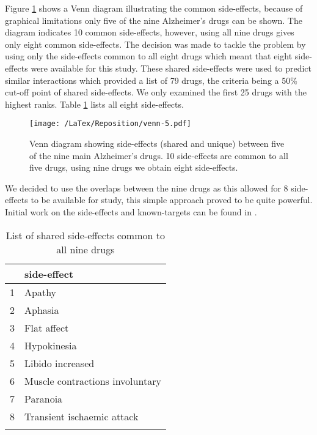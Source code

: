 \documentclass[preprint,12pt]{elsarticle}
\begin{document}
Figure \ref{venn} shows a Venn diagram illustrating the common side-effects, because of graphical limitations only five of the nine Alzheimer's drugs can be shown. The diagram indicates 10 common side-effects, however, using all nine drugs gives only eight common side-effects. The decision was made to tackle the problem by using only the side-effects common to all eight drugs which meant that eight side-effects were available for this study. These shared side-effects were used to predict similar interactions which provided a list of 79 drugs, the criteria being a 50\% cut-off point of shared side-effects. We only examined the first 25 drugs with the highest ranks.   Table \ref{se8} lists all eight side-effects.

\begin{figure}[h]
  \begin{center}
	 \texttt{[image: /LaTex/Reposition/venn-5.pdf]} %
  \end{center}
 \caption{Venn diagram showing side-effects (shared and unique) between five of the nine main Alzheimer's drugs. 10 side-effects are common to all five drugs, using nine drugs we obtain eight side-effects.}
\label{venn}
\end{figure}

We decided to use the overlaps between the nine drugs as this allowed for 8 side-effects to be available for study, this simple approach proved to be quite powerful.  Initial work on the side-effects and known-targets can be found in \cite{McGarry2015a,McGarry2015b,McGarry2016a}. 

\begin{table}[ht]
\centering \scriptsize \caption{List of shared side-effects common to all nine drugs}
\begin{tabular}{rl}
  \hline
 & side-effect \\ 
  \hline
1 & Apathy \\ 
  2 & Aphasia \\ 
  3 & Flat affect \\ 
  4 & Hypokinesia \\ 
  5 & Libido increased \\ 
  6 & Muscle contractions involuntary \\ 
  7 & Paranoia \\ 
  8 & Transient ischaemic attack \\ 
   \hline \normalsize
\end{tabular}
\label{se8}
\end{table}
\end{document}
